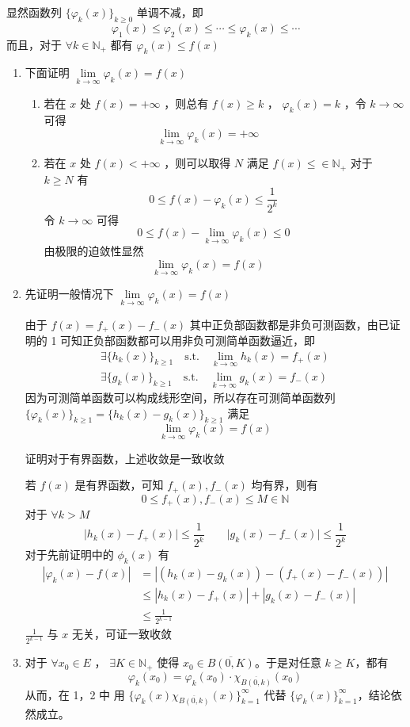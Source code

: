 \documentclass{ctexbook}
\newcommand{\st}{\mathrm{\quad s.t.\quad }}
\newcommand{\ITEMS}{\begin{enumerate}[leftmargin=4em]}
\newcommand{\ITEME}{\end{enumerate}}
\begin{document}
显然函数列 $\{\varphi_k(x)\}_{k\ge 0}$ 单调不减，即
\[
\varphi_1(x) \le \varphi_2(x) \le \cdots \le \varphi_k(x) \le \cdots
\]
而且，对于 $\forall k \in \mathbb{N}_+$ 都有 $\varphi_k(x) \le f(x)$

\ITEMS
\item 下面证明 $\lim\limits_{k\to\infty} \varphi_k(x) = f(x)$
\ITEMS
\item 若在 $x$ 处 $f(x) = +\infty$ ，则总有 $f(x) \ge k$ ， $\varphi_k(x) = k$ ，令 $k \to \infty$ 可得
\[
\lim\limits_{k\to\infty} \varphi_k(x) = +\infty \qquad\quad
\]

\item 若在 $x$ 处 $f(x) < +\infty$ ，则可以取得 $N$ 满足 $f(x) \le \in \mathbb{N}_+$ 对于 $k \ge N$ 有
\[
0 \le f(x) - \varphi_k(x) \le \frac{1}{2^k}\qquad
\]
令 $k \to \infty$ 可得
\[
0 \le f(x) - \lim\limits_{k\to\infty} \varphi_k(x) \le 0 \qquad
\]
由极限的迫敛性显然
\[
\lim\limits_{k\to\infty} \varphi_k(x) = f(x) \qquad\quad
\]		
\ITEME 

\item 先证明一般情况下 $\lim\limits_{k\to\infty} \varphi_k(x) = f(x)$

由于 $f(x) = f_+(x) - f_-(x)$ 其中正负部函数都是非负可测函数，由已证明的 1 可知正负部函数都可以用非负可测简单函数逼近，即
\[
\begin{aligned}
	\exists \{h_k(x)\}_{k\ge 1} \st \lim_{k\to\infty}h_k(x) = f_+(x)\\
	\exists \{g_k(x)\}_{k\ge 1} \st \lim_{k\to\infty}g_k(x) = f_-(x)
\end{aligned}
\]
因为可测简单函数可以构成线形空间，所以存在可测简单函数列 $\{\varphi_k(x)\}_{k\ge 1} = \{h_k(x) - g_k(x) \}_{k\ge 1}$ 满足
\[
\lim\limits_{k\to\infty} \varphi_k(x) = f(x)
\]
\smallskip

证明对于有界函数，上述收敛是一致收敛

若 $f(x)$ 是有界函数，可知 $f_+(x),f_-(x)$ 均有界，则有
\[
0\le f_+(x),f_-(x) \le M \in \mathbb{N}
\]
对于 $\forall k > M$
\[
\lvert h_k(x) - f_+(x)\rvert \le \frac{1}{2^k}\qquad \lvert g_k(x) - f_-(x)\rvert \le \frac{1}{2^k}
\]
对于先前证明中的 $\phi_k(x)$ 有
\[
\begin{aligned}
	|\varphi_k(x) - f(x)| &= |(h_k(x) - g_k(x)) - (f_+(x) - f_-(x))| \\
	&\le |h_k(x) - f_+(x)| + |g_k(x) - f_-(x)| \\
	&\le \frac{1}{2^{k-1}}
\end{aligned}	
\]
$\frac{1}{2^{k-1}}$ 与 $x$ 无关，可证一致收敛

\item 对于 $\forall x_0 \in E$ ， $\exists K \in \mathbb{N}_+$ 使得 $x_0 \in \overline{B(0,K)}$。于是对任意 $k\ge K$，都有
\[
\varphi_k(x_0)=\varphi_k(x_0)\cdot \chi_{\overline{B(0,k)}}(x_0)
\] 
从而，在 1，2 中 用 $\{\varphi_k(x)\chi_{\overline{B(0,k)}}(x)\}_{k=1} ^\infty$ 代替 $\{\varphi_k(x)\}_{k=1} ^\infty$，结论依然成立。
\ITEME
\end{document}
